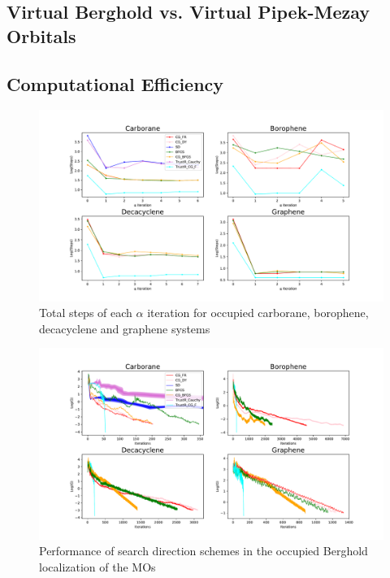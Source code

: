 \documentclass[aps,prl,reprint,amsmath,amssymb]{revtex4-1}
\begin{document}
\subsection{Virtual Berghold vs. Virtual Pipek-Mezay Orbitals}

\subsection{Computational Efficiency}
\begin{figure}[htb]
\centering
\includegraphics[width=\textwidth]{occupied_iter.pdf}
\caption{Total steps of each $\alpha$ iteration for occupied carborane, borophene, decacyclene and graphene systems}
\label{fig:occ_iter}
\end{figure}


\begin{figure}[htb]
\centering
\includegraphics[width=\textwidth]{occupied_grad.pdf}
\caption{Performance of search direction schemes in the occupied Berghold localization of the MOs}
\label{fig:occ_grad}
\end{figure}
\end{document}
